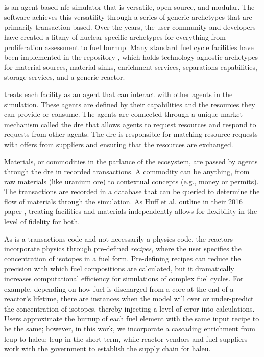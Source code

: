 \section{\cyclus}
\label{sec:cyclus}
\cyclus is an agent-based \gls{nfc} simulator that is versatile, open-source,
and modular. The software achieves this versatility through a series of generic
archetypes that are primarily transaction-based. Over the years, the user
community and developers have created a litany of nuclear-specific archetypes
for everything from proliferation assessment to fuel burnup. Many standard fuel
cycle facilities have been implemented in the \cycamore repository
\cite{Carlsen_cycamore_2014}, which holds technology-agnostic archetypes for
material sources, material sinks, enrichment services, separations
capabilities, storage services, and a generic reactor.

\cyclus treats each facility as an agent that can interact with other agents in
the simulation. These agents are defined by their capabilities and the resources
they can provide or consume. The agents are connected through a unique market
mechanism called the \gls{dre} that allows agents to request
resources and respond to requests from other agents. The \gls{dre} is responsible for matching resource requests with offers from suppliers and ensuring that the resources are exchanged.

Materials, or commodities in the parlance of the \cyclus ecosystem, are passed
by agents through the \gls{dre} in recorded transactions. A commodity can be
anything, from raw materials (like uranium ore) to contextual concepts (e.g.,
money or permits). The transactions are recorded
in a database that can be queried to determine the flow of materials through
the simulation. As Huff et al. outline in their 2016 paper
\cite{huff_cyclus_intro_2016}, treating facilities and materials independently
allows for flexibility in the level of fidelity for both.

As \cyclus is a transactions code and not necessarily a physics code,
the reactors incorporate physics through pre-defined \textit{recipes},
where the user specifies the concentration of isotopes in a fuel form.
Pre-defining recipes can reduce the precision with which
fuel compositions are calculated, but it dramatically increases computational
efficiency for simulations of complex fuel cycles. For example, depending
on how fuel is discharged from a core at the end of a reactor's lifetime, there
are instances when the model will over or under-predict the concentration of
isotopes, thereby injecting a level of error into calculations.
Users approximate the burnup of each fuel element with the same input recipe to
be the same; however, in this work, we incorporate a cascading enrichment from
\gls{leup} to \gls{haleu}; \gls{leup} in the short term, while reactor vendors
and fuel suppliers work with the government to establish the supply chain for
\gls{haleu}.

